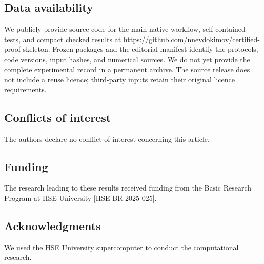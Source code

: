 \documentclass[pdflatex,sn-basic,Numbered]{sn-jnl}
\begin{document}
\subsection*{Data availability}\label{data-availability}

We publicly provide source code for the main native workflow, self-contained tests, and compact checked results at https://github.com/nnevdokimov/certified-proof-skeleton. Frozen packages and the editorial manifest identify the protocols, code versions, input hashes, and numerical sources. We do not yet provide the complete experimental record in a permanent archive. The source release does not include a reuse licence; third-party inputs retain their original licence requirements.

\subsection*{Conflicts of interest}\label{conflicts-of-interest}

The authors declare no conflict of interest concerning this article.

\subsection*{Funding}\label{funding}

The research leading to these results received funding from the Basic Research Program at HSE University {[}HSE-BR-2025-025{]}.

\subsection*{Acknowledgments}\label{acknowledgments}

We used the HSE University supercomputer to conduct the computational research.
\end{document}
